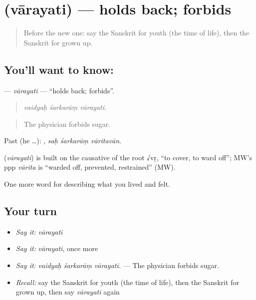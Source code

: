 \section[\texorpdfstring{\sk{वारयति} (vārayati)}{वारयति (vārayati)}]{ (vārayati) — holds back; forbids}

\label{lesson:SA-C495-varayati}



\begin{quote}
Before the new one: say the Sanskrit for youth (the time of life), then the Sanskrit for grown up.
\end{quote}

\subsection*{You'll want to know: }
\textbf{} — \emph{vārayati} — \textquotedblleft{}holds back; forbids\textquotedblright{}.

\begin{quote}
  
\end{quote}

\begin{quote}
\emph{vaidyaḥ śarkarāṃ vārayati.}
\end{quote}

\begin{quote}
The physician forbids sugar.
\end{quote}

Past (he …):   , \emph{saḥ śarkarāṃ vāritavān}.

\begin{cousinweb}
\textbf{} (\emph{vārayati}) is built on the causative of the root √vṛ, \textquotedblleft{}to cover, to ward off\textquotedblright{}; MW's ppp \emph{vārita} is \textquotedblleft{}warded off, prevented, restrained\textquotedblright{} (MW).
\end{cousinweb}

\begin{grammarlens}[title={What you've built}]
One more word for describing what you lived and felt.
\end{grammarlens}

\subsection*{Your turn}
\begin{itemize}
\raggedright
  \item \emph{Say it:} \emph{vārayati}
  \item \emph{Say it:} \emph{vārayati}, once more
  \item \emph{Say it:} \emph{vaidyaḥ śarkarāṃ vārayati.} — The physician forbids sugar.
  \item \emph{Recall:} say the Sanskrit for youth (the time of life), then the Sanskrit for grown up, then say \emph{vārayati} again
\end{itemize}

